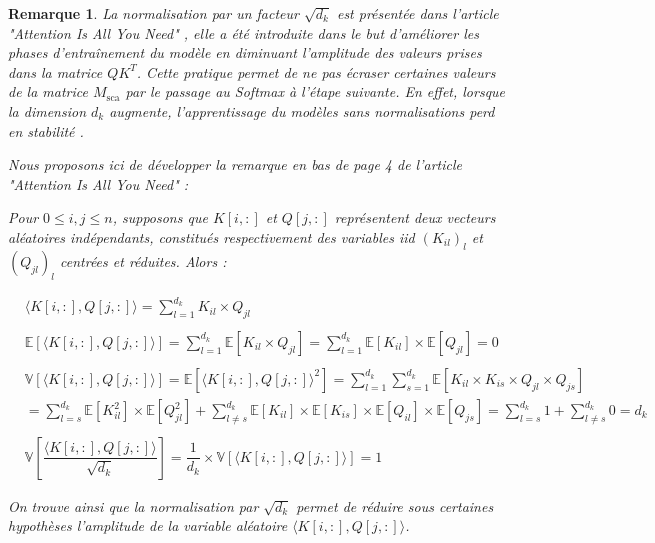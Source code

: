 \documentclass[12pt]{article}
\newtheorem{rmq}{Remarque}
\theoremstyle{definition}
\begin{document}
\begin{rmq}
	La normalisation par un facteur \(\sqrt{d_k}\) est présentée dans l'article \textit{"Attention Is All You Need}" \cite{a_i_a_y_n}, elle a été introduite dans le but d'améliorer les phases d'entraînement du modèle en diminuant l'amplitude des valeurs prises dans la matrice \(QK^T\). Cette pratique permet de ne pas écraser certaines valeurs de la matrice \(M_{\text{sca}}\) par le passage au Softmax à l'étape suivante. En effet, lorsque la dimension $d_k$ augmente, l'apprentissage du modèles sans normalisations perd en stabilité \cite{a_i_a_y_n}. 
	
	Nous proposons ici de développer la remarque en bas de page 4 de l'article \textit{"Attention Is All You Need}" \cite{a_i_a_y_n} : 
	
	Pour $0\leq i,j \leq n$, supposons que $K[i,:]$ et $Q[j,:]$ représentent deux vecteurs aléatoires indépendants, constitués respectivement des variables iid $(K_{il})_l$ et $(Q_{jl})_l$ centrées et réduites. Alors : 
	

	\begin{align*}
		&\langle K[i,:] , Q[j,:]\rangle = \sum_{l=1}^{d_k} K_{il} \times Q_{jl}\\\\
		&\mathbb{E}\left[\langle K[i,:] , Q[j,:]\rangle\right] = \sum_{l=1}^{d_k} \mathbb{E}\left[K_{il} \times Q_{jl}\right] = \sum_{l=1}^{d_k} \mathbb{E}\left[K_{il} \right] \times \mathbb{E}\left[ Q_{jl}\right] = 0\\\\
		&\mathbb{V}\left[\langle K[i,:] , Q[j,:]\rangle\right] = \mathbb{E}\left[\langle K[i,:] , Q[j,:]\rangle^2\right] = \sum_{l=1}^{d_k}\sum_{s=1}^{d_k} \mathbb{E}\left[K_{il} \times K_{is} \times Q_{jl}\times Q_{js}\right] \\
		& = \sum_{l=s}^{d_k} \mathbb{E}\left[K_{il}^2 \right] \times \mathbb{E}\left[ Q_{jl}^2\right] +  \sum_{l\neq s}^{d_k} \mathbb{E}\left[K_{il}\right] \times \mathbb{E}\left[K_{is}\right]\times \mathbb{E}\left[Q_{il}\right]\times \mathbb{E}\left[ Q_{js}\right] = \sum_{l=s}^{d_k} 1 +  \sum_{l\neq s}^{d_k} 0 = d_k\\ \\
		&\mathbb{V}\left[\dfrac{\langle K[i,:] , Q[j,:]\rangle}{\sqrt{d_k}}\right] = \dfrac{1}{d_k} \times \mathbb{V}\left[\langle K[i,:] , Q[j,:]\rangle\right] = 1
	\end{align*}


On trouve ainsi que la normalisation par $\sqrt{d_k}$ permet de réduire sous certaines hypothèses l'amplitude de la variable aléatoire $\langle K[i,:] , Q[j,:]\rangle$. \\[1cm]


\end{rmq}
\end{document}
